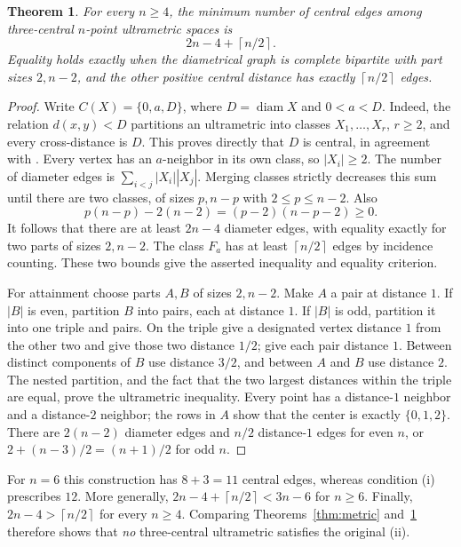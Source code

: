 \documentclass[11pt]{article}
\newtheorem{theorem}{Theorem}
\newcommand{\diam}{\operatorname{diam}}
\newcommand{\ceil}[1]{\left\lceil #1\right\rceil}
\begin{document}
\begin{theorem}\label{thm:ultra}
For every $n\ge4$, the minimum number of central edges among
three-central $n$-point ultrametric spaces is
\[
 2n-4+\ceil{n/2}.
\]
Equality holds exactly when the diametrical graph is complete
bipartite with part sizes $2,n-2$, and the other positive central
distance has exactly $\ceil{n/2}$ edges.
\end{theorem}
\begin{proof}
Write $C(X)=\{0,a,D\}$, where $D=\diam X$ and $0<a<D$.
Indeed, the relation $d(x,y)<D$ partitions an ultrametric into
classes $X_1,\ldots,X_r$, $r\ge2$, and every cross-distance is $D$.
This proves directly that $D$ is central, in agreement with
\cite[Theorem 2.15]{DR}.
Every vertex has an $a$-neighbor in its own class, so $|X_i|\ge2$.
The number of diameter edges is $\sum_{i<j}|X_i||X_j|$.
Merging classes strictly decreases this sum until there are two
classes, of sizes $p,n-p$ with $2\le p\le n-2$. Also
\[
 p(n-p)-2(n-2)=(p-2)(n-p-2)\ge0.
\]
It follows that there are at least $2n-4$ diameter edges, with
equality exactly for two parts of sizes $2,n-2$. The class $F_a$
has at least $\ceil{n/2}$ edges by incidence counting.
These two bounds give the asserted inequality and equality criterion.

For attainment choose parts $A,B$ of sizes $2,n-2$. Make $A$ a
pair at distance $1$. If $|B|$ is even, partition $B$ into pairs,
each at distance $1$. If $|B|$ is odd, partition it into one triple
and pairs. On the triple give a designated vertex distance $1$
from the other two and give those two distance $1/2$; give each
pair distance $1$. Between distinct components of $B$ use distance
$3/2$, and between $A$ and $B$ use distance $2$.
The nested partition, and the fact that the two largest distances
within the triple are equal, prove the ultrametric inequality.
Every point has a distance-$1$ neighbor and a distance-$2$ neighbor;
the rows in $A$ show that the center is exactly $\{0,1,2\}$.
There are $2(n-2)$ diameter edges and $n/2$ distance-$1$ edges for
even $n$, or $2+(n-3)/2=(n+1)/2$ for odd $n$.
\end{proof}

For $n=6$ this construction has $8+3=11$ central edges, whereas
condition (i) prescribes $12$. More generally,
$2n-4+\ceil{n/2}<3n-6$ for $n\ge6$.
Finally, $2n-4>\ceil{n/2}$ for every $n\ge4$. Comparing
Theorems~\ref{thm:metric} and~\ref{thm:ultra} therefore shows that
\emph{no} three-central ultrametric satisfies the original (ii).
\end{document}
